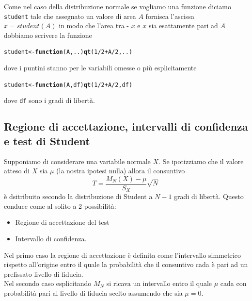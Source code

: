 \documentclass[onecolumn,12pt]{book}\usepackage[]{graphicx}\usepackage[]{color}
\makeatletter
\newcommand{\hlnum}[1]{\textcolor[rgb]{0.686,0.059,0.569}{#1}}%
\newcommand{\hlopt}[1]{\textcolor[rgb]{0,0,0}{#1}}%
\newcommand{\hlstd}[1]{\textcolor[rgb]{0.345,0.345,0.345}{#1}}%
\newcommand{\hlkwa}[1]{\textcolor[rgb]{0.161,0.373,0.58}{\textbf{#1}}}%
\newcommand{\hlkwb}[1]{\textcolor[rgb]{0.69,0.353,0.396}{#1}}%
\newcommand{\hlkwc}[1]{\textcolor[rgb]{0.333,0.667,0.333}{#1}}%
\newcommand{\hlkwd}[1]{\textcolor[rgb]{0.737,0.353,0.396}{\textbf{#1}}}%
\newenvironment{kframe}{%
 \def\at@end@of@kframe{}%
 \ifinner\ifhmode%
  \def\at@end@of@kframe{\end{minipage}}%
  \begin{minipage}{\columnwidth}%
 \fi\fi%
 \def\FrameCommand##1{\hskip\@totalleftmargin \hskip-\fboxsep
 \colorbox{shadecolor}{##1}\hskip-\fboxsep
     \hskip-\linewidth \hskip-\@totalleftmargin \hskip\columnwidth}%
 \MakeFramed {\advance\hsize-\width
   \@totalleftmargin\z@ \linewidth\hsize
   \@setminipage}}%
 {\par\unskip\endMakeFramed%
 \at@end@of@kframe}
\newenvironment{knitrout}{}{} %
\makeatother
\begin{document}
Come nel caso della distribuzione normale se vogliamo una funzione diciamo \texttt{student}  tale che assegnato un valore di area $A$   fornisca l'ascissa $x=student(A)$  in modo che l'area tra - $x$ e $x$ sia esattamente pari ad $A$ dobbiamo scrivere la funzione
\begin{knitrout}
\color{fgcolor}\begin{kframe}
\begin{alltt}
\hlstd{student}\hlkwb{<-}\hlkwa{function} \hlstd{(}\hlkwc{A}\hlstd{,}\hlkwc{..}\hlstd{)} \hlkwd{qt} \hlstd{(}\hlnum{1}\hlopt{/}\hlnum{2} \hlopt{+} \hlstd{A}\hlopt{/}\hlnum{2}\hlstd{,..)}
\end{alltt}
\end{kframe}
\end{knitrout}
dove i puntini stanno per le variabili omesse o pi\`u esplicitamente
\begin{knitrout}
\color{fgcolor}\begin{kframe}
\begin{alltt}
\hlstd{student}\hlkwb{<-}\hlkwa{function} \hlstd{(}\hlkwc{A}\hlstd{,}\hlkwc{df}\hlstd{)} \hlkwd{qt} \hlstd{(}\hlnum{1}\hlopt{/}\hlnum{2} \hlopt{+} \hlstd{A}\hlopt{/}\hlnum{2}\hlstd{,df)}
\end{alltt}
\end{kframe}
\end{knitrout}
dove \texttt{df} sono i gradi di libert\`a. 
\subsection
{Regione di accettazione, intervalli di confidenza e test di Student}

Supponiamo di considerare una variabile normale $X$. Se ipotizziamo che il valore atteso di $X$ sia   $\mu$ (la nostra ipotesi nulla) allora il consuntivo $$T=\dfrac{M_N(X)-\mu}{S_X}\sqrt {N}$$
\`e dsitribuito secondo la distribuzione di Student a $N-1$ gradi di libert\`a. Questo conduce come al solito a 2 possibilit\`a:
\begin{itemize}
\item Regione di accettazione del test
\item Intervallo di confidenza.
\end{itemize}
Nel primo caso la regione di accettazione \`e definita come l'intervallo simmetrico rispetto all'origine entro il quale la probabilit\`a che il consuntivo cada è pari ad un prefissato livello di fiducia.\\
Nel secondo caso esplicitando $M_N$ si ricava un intervallo entro il quale $\mu$ cada con probabilit\`a pari al livello di fiducia scelto
assumendo che sia $\mu=0$.
\end{document}
